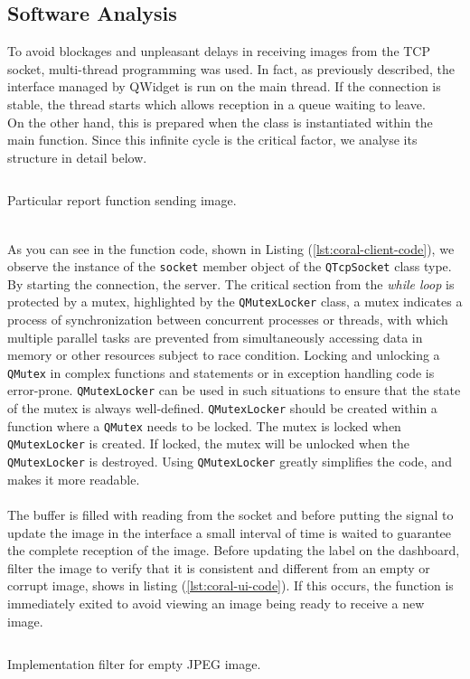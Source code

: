 \subsection{Software Analysis}
\label{ssec:software-coral-analysis}
To avoid blockages and unpleasant delays in receiving images from the TCP
socket, multi-thread programming was used. In fact, as previously described, the
interface managed by QWidget is run on the main thread. If the connection is
stable, the thread starts which allows reception in a queue waiting to leave.\\ 
On the other hand, this is prepared when the class is instantiated within the
main function. Since this infinite cycle is the critical factor, we analyse its
structure in detail below.
%
\begin{listing}[ht] 
\inputminted[frame=lines,framesep=2mm, linenos=true, autogobble, breaklines=true, fontsize=\scriptsize, firstline=12, lastline=26]{c++}{software/code/streamerthread.cpp} 
\caption{Particular report function sending image.} 
\label{lst:coral-client-code} 
\end{listing}
%
\\As you can see in the function code, shown in Listing
(\ref{lst:coral-client-code}), we observe the instance of the \texttt{socket}
member object of the \texttt{QTcpSocket} class type. 
By starting the connection, the server. 
The critical section from the \emph{while loop} is protected by a mutex,
highlighted by the \texttt{QMutexLocker} class, a mutex indicates a
process of synchronization between concurrent processes or threads, with which
multiple parallel tasks are prevented from simultaneously accessing 
data in memory or other resources subject to race condition.\cite{wiki:mutex} \hfill \break
Locking and unlocking a \texttt{QMutex} in complex functions and statements or
in exception handling code is error-prone.
\texttt{QMutexLocker} can be used in such situations to ensure that the state of the
mutex is always well-defined. \texttt{QMutexLocker} should be created within a
function where a \texttt{QMutex} needs to be locked. The mutex is locked when
\texttt{QMutexLocker} is created. If locked, the mutex will be unlocked when
the \texttt{QMutexLocker} is destroyed.
Using \texttt{QMutexLocker} greatly simplifies the code, and makes it more
readable.\cite{Qt:QMutexclass}\\
\\\noindent The buffer is filled with reading from the socket and before putting the signal
to update the image in the interface a small interval of time is waited to
guarantee the complete reception of the image.
Before updating the label on the dashboard, filter the image to verify that it
is consistent and different from an empty or corrupt image, shows in listing
(\ref{lst:coral-ui-code}). 
If this occurs, the function is immediately exited to
avoid viewing an image being ready to receive a new image. 
%
\begin{listing}[ht] 
\inputminted[frame=lines,framesep=2mm, linenos=true, autogobble, breaklines=true, fontsize=\scriptsize, firstline=88, lastline=100]{c++}{software/code/tcpclient.cpp} 
\caption{Implementation filter for empty JPEG image.} 
\label{lst:coral-ui-code} 
\end{listing}
